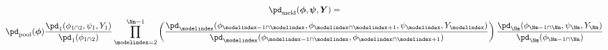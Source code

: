 \begin{multline}
  \pd_{\text{meld}} (\boldsymbol{\phi}, \boldsymbol{\psi}, \boldsymbol{Y}) = \\
    \pd_{\text{pool}}(\boldsymbol{\phi})   
    \frac {
      \pd_{1} (\phi_{1 \cap 2}, \psi_{1}, Y_{1})
    } {
      \pd_{1}(\phi_{1 \cap 2})
    }
    \prod_{\modelindex = 2}^{\Nm - 1} \left(
      \frac {
        \pd_{\modelindex} (\phi_{\modelindex - 1 \cap \modelindex}, \phi_{\modelindex \cap \modelindex + 1}, \psi_{\modelindex}, Y_{\modelindex})
      } {
        \pd_{\modelindex}(\phi_{\modelindex - 1 \cap \modelindex}, \phi_{\modelindex \cap \modelindex + 1})
      }
    \right)
    \frac {
      \pd_{\Nm} (\phi_{\Nm - 1 \cap \Nm}, \psi_{\Nm}, Y_{\Nm})
    } {
      \pd_{\Nm}(\phi_{\Nm - 1 \cap \Nm})
    }
  \label{eqn:melded-model-general}
\end{multline}